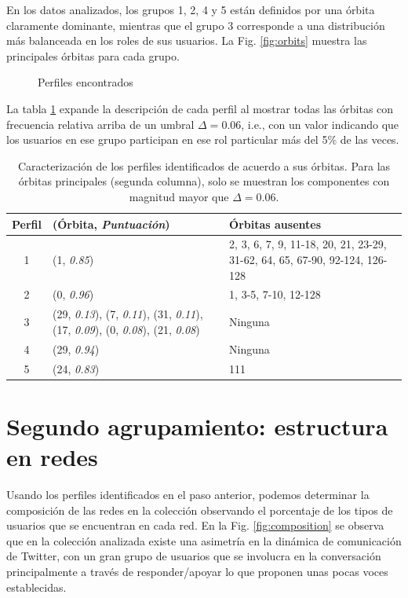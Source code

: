En los datos analizados, los grupos 1, 2, 4 y 5 están definidos por una órbita claramente dominante, mientras que el grupo 3 corresponde a una distribución más balanceada en los roles de sus usuarios. La Fig. \ref{fig:orbits} muestra las principales órbitas para cada grupo. 

\begin{figure}[htbp]
   \centering
   
    \caption{Perfiles encontrados}
    \label{fig:perfiles}
\end{figure}

La tabla \ref{table:orbitsgroups} expande la descripción de cada perfil al mostrar todas las órbitas con frecuencia relativa arriba de un umbral $\Delta = 0.06$, i.e., con un valor indicando que los usuarios en ese grupo participan en ese rol particular más del 5\% de las veces. 
\begin{table}[]    
    \centering
    \caption{Caracterización de los perfiles identificados de acuerdo a sus órbitas. Para las órbitas principales (segunda columna), solo se muestran los componentes con magnitud mayor que $\Delta=0.06$.}
    \begin{tabular}{cp{}p{}}\hline
         \textbf{Perfil}\phantom{xx} & \textbf{(Órbita, \textit{Puntuación})}&\textbf{Órbitas ausentes}\\\hline\hline
         1& (1, \textit{0.85}) & 2, 3, 6, 7, 9, 11-18, 20, 21, 23-29, 31-62, 64, 65, 67-90, 92-124, 126-128\\
         2&(0, \textit{0.96})&1, 3-5, 7-10, 12-128\\
         3&(29, \textit{0.13}), (7, \textit{0.11}), \newline(31, \textit{0.11}), (17, \textit{0.09}), \newline(0, \textit{0.08}), (21, \textit{0.08}) & Ninguna \\
         4& (29, \textit{0.94}) & Ninguna \\ 
         5&(24, \textit{0.83}) & 111 \\\hline
    \end{tabular}
    \label{table:orbitsgroups}
\end{table}

\section{Segundo agrupamiento: estructura en redes}
\label{sec:experiments:clustering}

Usando los perfiles identificados en el paso anterior, podemos determinar la composición de las redes en la colección observando el porcentaje de los tipos de usuarios que se encuentran en cada red. En la Fig. \ref{fig:composition} se observa que en la colección analizada existe una asimetría en la dinámica de comunicación de Twitter, con un gran grupo de usuarios que se involucra en la conversación principalmente a través de responder/apoyar lo que proponen unas pocas voces establecidas.  

